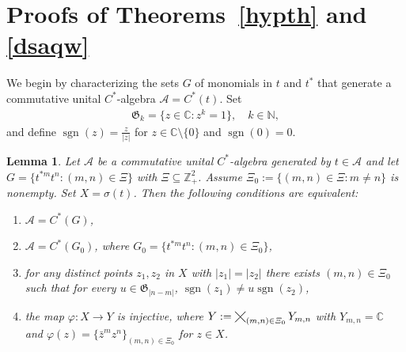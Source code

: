 \documentclass[reqno]{amsproc}
\DeclareMathOperator*{\smallcross}{\smallCross}
\DeclareMathOperator{\sgn}{sgn}
\numberwithin{equation}{section}
\newtheorem{lemma}[theorem]{Lemma}
\theoremstyle{remark}
\newcommand*{\ascr}{\mathscr{A}}
\newcommand*{\natu}{\mathbb{N}}
\newcommand{\smallCross}{\mathbin{\tikz [x=1.1ex,y=1.1ex,line width=.15ex,
   baseline={([yshift=-0.6ex]current bounding
   box.center)}]
   \draw (-1,-1) -- (1,1) (-1,1) -- (1,-1);}}%
\newcommand*{\comp}{\mathbb{C}}
\newcommand*{\cbb}{\comp}
\theoremstyle{definition}
\newcommand*{\zbb}{\mathbb{Z}}
\begin{document}
   \section{\label{Sec.6w}Proofs of Theorems~\ref{hypth}
and \ref{dsaqw}}
   We begin by characterizing the sets $G$ of
monomials in $t$ and $t^*$ that generate a commutative
unital $C^*$-algebra $\ascr=C^*(t)$. Set
   \begin{align} \label{saqur}
\mathfrak{G}_k = \big\{z \in \cbb\colon z^k = 1
\big\}, \quad k \in \natu,
   \end{align}
and define $\sgn(z)=\frac{z}{|z|}$ for $z \in \cbb
\setminus \{0\}$ and $\sgn(0)=0$.
   \begin{lemma}\label{winjkw}
Let $\ascr$ be a commutative unital $C^*$-algebra
generated by $t\in \ascr$ and let $G=\{t^{*m} t^n
\colon (m,n) \in \varXi\}$ with $\varXi
\subseteq\zbb_+^2$. Assume $\varXi_0 := \{(m,n)\in
\varXi\colon m\neq n\}$ is nonempty. Set
$X=\sigma(t)$. Then the following conditions are
equivalent{\em :}
   \begin{enumerate}
   \item[(i)] $\ascr=C^*(G)$,
   \item[(ii)] $\ascr=C^*(G_0)$, where
$G_0=\{t^{*m} t^n \colon (m,n) \in \varXi_0\}$,
   \item[(iii)] for any distinct points $z_1,z_2$
in $X$ with $|z_1|=|z_2|$ there exists $(m,n)\in
\varXi_0$ such that for every $u\in
\mathfrak{G}_{|n-m|}$, $\sgn(z_1) \neq u \sgn(z_2)$,
   \item[(iv)] the map $\varphi\colon
X \to Y$ is injective, where $Y:=
\smallcross_{(m,n)\in \varXi_0} Y_{m,n}$ with
$Y_{m,n}=\cbb$ and $\varphi(z) = \{\bar z^{m}
z^n\}_{(m,n)\in \varXi_0}$ for $z \in X$.
   \end{enumerate}
   \end{lemma}
\end{document}
